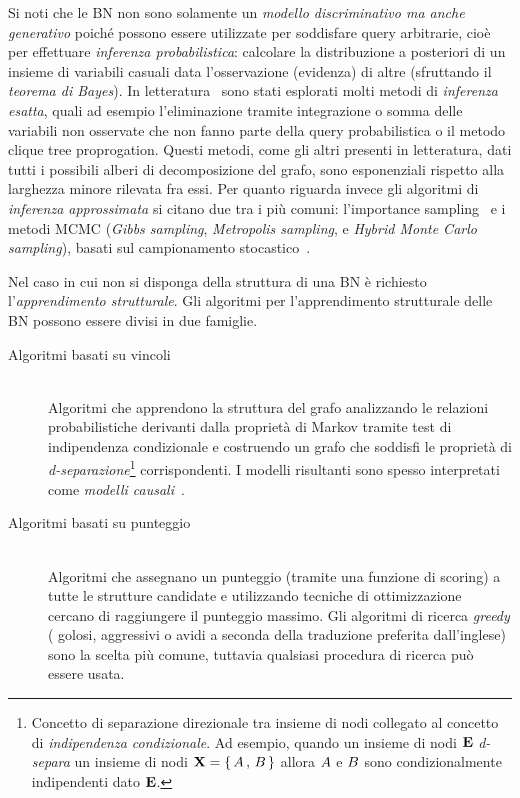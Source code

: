 Si noti che le \acl{BN} non sono solamente un \emph{modello discriminativo ma anche generativo} poiché possono essere utilizzate per soddisfare query arbitrarie, cioè per effettuare \emph{inferenza probabilistica}: calcolare la distribuzione a posteriori di un insieme di variabili casuali data l'osservazione (evidenza) di altre (sfruttando il \emph{teorema di Bayes}). In letteratura~\citep[si veda][]{Heckerman1996} sono stati esplorati molti metodi di \emph{inferenza esatta}, quali ad esempio l'eliminazione tramite integrazione o somma delle variabili non osservate che non fanno parte della query probabilistica o il metodo clique tree proprogation. Questi metodi, come gli altri presenti in letteratura, dati tutti i possibili alberi di decomposizione del grafo, sono esponenziali rispetto alla larghezza minore rilevata fra essi. Per quanto riguarda invece gli algoritmi di \emph{inferenza approssimata} si citano due tra i più comuni: l'importance sampling~\citep{Shachter1990} e i metodi \acf{MCMC} (\emph{Gibbs sampling}, \emph{Metropolis sampling}, e \emph{Hybrid Monte Carlo sampling}), basati sul campionamento stocastico~\citep[si veda][]{Geman1984,Gilks1996,MacKay1998}.

Nel caso in cui non si disponga della struttura di una \acs{BN} è richiesto l'\emph{apprendimento strutturale}. Gli algoritmi per l'apprendimento strutturale delle \acl{BN} possono essere divisi in due famiglie.
\begin{description}
    \item[Algoritmi basati su vincoli] \hfill \\
    Algoritmi che apprendono la struttura del grafo analizzando le relazioni probabilistiche derivanti dalla proprietà di Markov tramite test di indipendenza condizionale e costruendo un grafo che soddisfi le proprietà di \emph{d-separazione}\footnote{Concetto di separazione direzionale tra insieme di nodi collegato al concetto di \emph{indipendenza condizionale}. Ad esempio, quando un insieme di nodi $\mathbf{E}$ \emph{d-separa} un insieme di nodi $\mathbf{X}=\{\,\mathnormal{A}\,,\,\mathnormal{B}\,\}$ allora $\mathnormal{A}$ e $\mathnormal{B}$ sono condizionalmente indipendenti dato $\mathbf{E}$.} corrispondenti. I modelli risultanti sono spesso interpretati come \emph{modelli causali}~\citep{Pearl1988}.
    \item[Algoritmi basati su punteggio] \hfill \\
    Algoritmi che assegnano un punteggio (tramite una funzione di scoring) a tutte le strutture candidate e utilizzando tecniche di ottimizzazione cercano di raggiungere il punteggio massimo. Gli algoritmi di ricerca \emph{greedy} (\ie{} golosi, aggressivi o avidi a seconda della traduzione preferita dall'inglese) sono la scelta più comune, tuttavia qualsiasi procedura di ricerca può essere usata.
\end{description}


